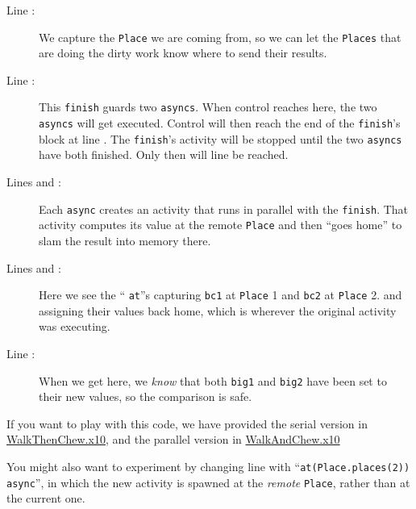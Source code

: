 \begin{description}
\item[Line : ]
We capture the {\tt Place} we are coming from, so we can let the {\tt Places}
that are doing the dirty work know where to send their results.
\item[Line : ]
This {\tt finish} guards two {\tt asyncs}.  When control reaches here, the two {\tt asyncs}
will get executed.  Control will then reach the end of the {\tt finish}'s block
at line . The {\tt finish}'s  activity will be stopped until the 
two {\tt asyncs} have both finished.  Only then will line  
be reached.
\item[Lines  and : ]
Each {\tt async} creates an activity that runs in parallel with the {\tt finish}.
That activity computes its value at the remote {\tt Place}
and then ``goes home'' to slam the result into memory there.
\item[Lines  and : ]
Here we see the `` {\tt at}''s capturing {\tt bc1} at {\tt Place} 1 and {\tt bc2} at 
{\tt Place} 2.
and assigning their values back home, which is wherever the original activity was executing.
\item[Line : ]
When we get here, we {\em know} that both {\tt big1} and {\tt big2} have been
set to their new values, so the comparison is safe.
\end{description}

If you want to play with this code, we have provided the serial version in
\href{src/concurrency/WalkThenChew.x10}{WalkThenChew.x10}, and the
parallel version in \href{src/concurrency/WalkAndChew.x10}{WalkAndChew.x10}

You might also want to experiment by changing line 
 with ``{\tt at(Place.places(2))} {\tt async}'', in
which the new activity is spawned at the {\em remote} {\tt Place}, rather than at
the current one. 

